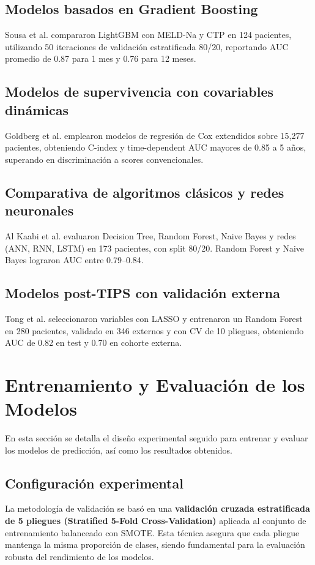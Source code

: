\documentclass[journal]{IEEEtai}
\begin{document}
\subsection{Modelos basados en Gradient Boosting}
Sousa et al. \cite{Sousa2024} compararon LightGBM con MELD-Na y CTP en 124 pacientes, utilizando 50 iteraciones de validación estratificada 80/20, reportando AUC promedio de 0.87 para 1 mes y 0.76 para 12 meses.

\subsection{Modelos de supervivencia con covariables dinámicas}
Goldberg et al. \cite{Goldberg2023} emplearon modelos de regresión de Cox extendidos sobre 15,277 pacientes, obteniendo C-index y time-dependent AUC mayores de 0.85 a 5 años, superando en discriminación a scores convencionales.

\subsection{Comparativa de algoritmos clásicos y redes neuronales}
Al Kaabi et al. \cite{AlKaabi2024} evaluaron Decision Tree, Random Forest, Naive Bayes y redes (ANN, RNN, LSTM) en 173 pacientes, con split 80/20. Random Forest y Naive Bayes lograron AUC entre 0.79–0.84.

\subsection{Modelos post-TIPS con validación externa}
Tong et al. \cite{Tong2024} seleccionaron variables con LASSO y entrenaron un Random Forest en 280 pacientes, validado en 346 externos y con CV de 10 pliegues, obteniendo AUC de 0.82 en test y 0.70 en cohorte externa.

\section{Entrenamiento y Evaluación de los Modelos}
En esta sección se detalla el diseño experimental seguido para entrenar y evaluar los modelos de predicción, así como los resultados obtenidos.

\subsection{Configuración experimental}
La metodología de validación se basó en una \textbf{validación cruzada estratificada de 5 pliegues (Stratified 5-Fold Cross-Validation)} aplicada al conjunto de entrenamiento balanceado con SMOTE. Esta técnica asegura que cada pliegue mantenga la misma proporción de clases, siendo fundamental para la evaluación robusta del rendimiento de los modelos.
\end{document}
